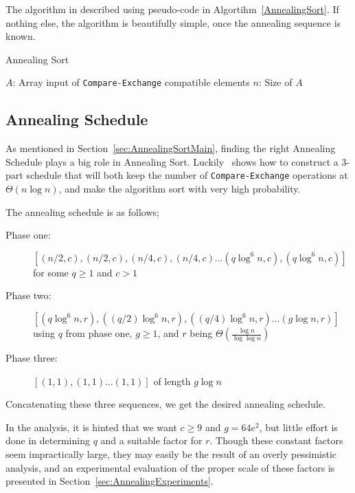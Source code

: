 The algorithm in described using pseudo-code in Algortihm~\ref{AnnealingSort}.
If nothing else, the algorithm is beautifully simple, once the annealing sequence is known.

\begin{algorithm}
\caption{Annealing Sort}\label{AnnealingSort}
\begin{algorithmic}[1]
	\Statex $A$: Array input of \texttt{Compare-Exchange} compatible elements
	\Statex $n$: Size of $A$
		\EndFor
	\EndFor
		\EndFor
	\EndFor
\EndFor
\EndProcedure
\end{algorithmic}
\end{algorithm}


\subsection{Annealing Schedule}

As mentioned in Section~\ref{sec:AnnealingSortMain}, finding the right Annealing Schedule plays a big role in Annealing Sort. Luckily~ shows how to construct a 3-part schedule that will both keep the number of \texttt{Compare-Exchange} operations at $\Theta(n \log n)$, and make the algorithm sort with very high probability.

The annealing schedule is as follows;

\begin{description}
\item[Phase one:] $[(n/2, c), (n/2, c), (n/4, c), (n/4, c) \dots (q \log^6 n, c), (q \log^6 n, c)]$ for some $q \geq 1$ and $c > 1$
\item[Phase two:] $[(q \log^6 n, r),((q/2) \log^6 n, r), ((q/4) \log^6 n, r) \dots (g \log n, r)]$ using $q$ from phase one, $g \geq 1$,  and $r$ being $\Theta(\frac{\log n}{\log \log n})$
\item[Phase three:] $[(1,1), (1,1) \dots (1,1)]$ of length $g \log n$
\end{description}

Concatenating these three sequences, we get the desired annealing schedule.

In the analysis, it is hinted that we want $c \geq 9$ and $g = 64e^2$, but little effort is done in determining $q$ and a suitable factor for $r$. Though these constant factors seem impractically large, they may easily be the result of an overly pessimistic analysis, and an experimental evaluation of the proper scale of these factors is presented in Section~\ref{sec:AnnealingExperiments}.

